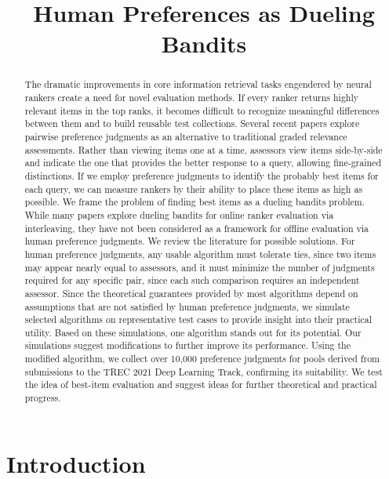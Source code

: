 \title{Human Preferences as Dueling Bandits}

\begin{abstract}
The dramatic improvements in core information retrieval tasks engendered by neural rankers create a need for novel evaluation methods. If every ranker returns highly relevant items in the top ranks, it becomes difficult to recognize meaningful differences between them and to build reusable test collections. Several recent papers explore pairwise preference judgments as an alternative to traditional graded relevance assessments. Rather than viewing items one at a time, assessors view items side-by-side and indicate the one that provides the better response to a query, allowing fine-grained distinctions. If we employ preference judgments to identify the probably best items for each query, we can measure rankers by their ability to place these items as high as possible. We frame the problem of finding best items as a dueling bandits problem. While many papers explore dueling bandits for online ranker evaluation via interleaving, they have not been considered as a framework for offline evaluation via human preference judgments. We review the literature for possible solutions. For human preference judgments, any usable algorithm must tolerate ties, since two items may appear nearly equal to assessors, and it must minimize the number of judgments required for any specific pair, since each such comparison requires an independent assessor. Since the theoretical guarantees provided by most algorithms depend on assumptions that are not satisfied by human preference judgments, we simulate selected algorithms on representative test cases to provide insight into their practical utility. Based on these simulations, one algorithm stands out for its potential. Our simulations suggest modifications to further improve its performance. Using the modified algorithm, we collect over 10,000 preference judgments for pools derived from submissions to the TREC 2021 Deep Learning Track, confirming its suitability. We test the idea of best-item evaluation and suggest ideas for further theoretical and practical progress.
\end{abstract}

\section{Introduction}

